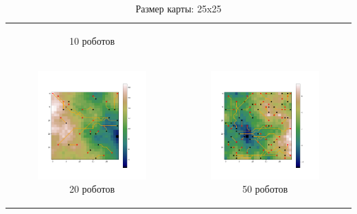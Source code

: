 \documentclass{article}
\numberwithin{equation}{section}
\begin{document}
\begin{table}[H]
\begin{tabular}{c c}
\begin{subfigure}{0.5\linewidth}
			\caption*{10 роботов}
			\end{subfigure}
			\\
            \begin{subfigure}{0.5\linewidth}
				\includegraphics[width = 1.0\columnwidth]{data/mean_paths/25x25/20.png}
			\caption*{20 роботов}
			\end{subfigure}
			&
			\begin{subfigure}{0.5\linewidth}
				\includegraphics[width = 1.0\columnwidth]{data/mean_paths/25x25/50.png}
			\caption*{50 роботов}
			\end{subfigure}
        \end{tabular}
        \caption*{Размер карты: 25x25}
	\end{table}
\end{document}
